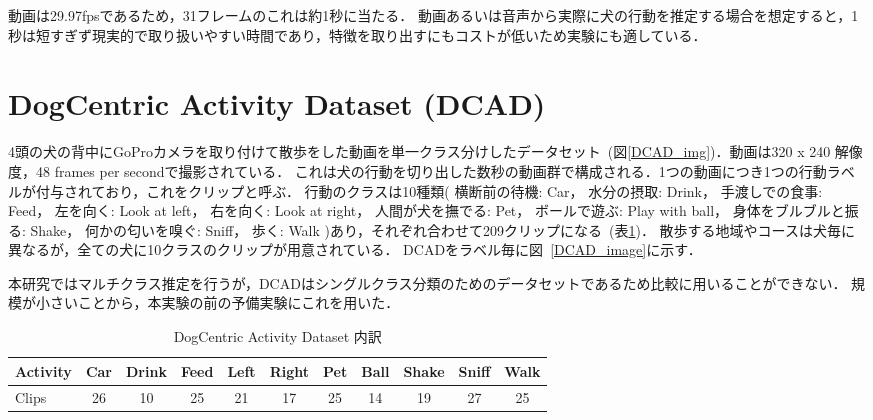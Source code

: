 動画は29.97fpsであるため，31フレームのこれは約1秒に当たる．
動画あるいは音声から実際に犬の行動を推定する場合を想定すると，1秒は短すぎず現実的で取り扱いやすい時間であり，特徴を取り出すにもコストが低いため実験にも適している．


\section{DogCentric Activity Dataset (DCAD)}
4頭の犬の背中にGoProカメラを取り付けて散歩をした動画を単一クラス分けしたデータセット~(図\ref{DCAD_img})．動画は320 x 240 解像度，48 frames per secondで撮影されている．
これは犬の行動を切り出した数秒の動画群で構成される．1つの動画につき1つの行動ラベルが付与されており，これをクリップと呼ぶ．
行動のクラスは10種類(
横断前の待機: Car， 水分の摂取: Drink， 手渡しでの食事: Feed， 左を向く: Look at left， 右を向く: Look at right， 人間が犬を撫でる: Pet， ボールで遊ぶ: Play with ball， 身体をブルブルと振る: Shake， 何かの匂いを嗅ぐ: Sniff， 歩く: Walk
)あり，それぞれ合わせて209クリップになる~(表\ref{DCADlabel})．
散歩する地域やコースは犬毎に異なるが，全ての犬に10クラスのクリップが用意されている．
DCADをラベル毎に図~\ref{DCAD_image}に示す．

本研究ではマルチクラス推定を行うが，DCADはシングルクラス分類のためのデータセットであるため比較に用いることができない．
規模が小さいことから，本実験の前の予備実験にこれを用いた．
\begin{table}[tb]
 \centering
 \caption{DogCentric Activity Dataset 内訳}\label{DCADlabel}
  \begin{tabular}{|l||c|c|c|c|c|c|c|c|c|c|}
   \hline \hline
   Activity& Car &Drink& Feed& Left&Right& Pet & Ball&Shake&Sniff&Walk \\ \hline
   Clips   &   26&   10&   25&   21&   17&   25&   14&   19&   27&   25\\ \hline
  \end{tabular}

\end{table}

